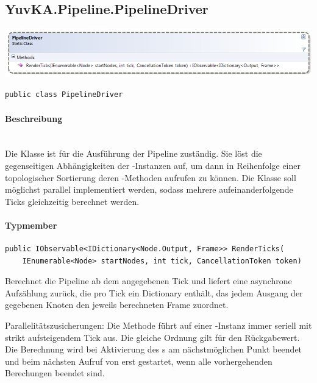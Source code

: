 \subsection{YuvKA.Pipeline.PipelineDriver}

\includegraphics[width=\textwidth]{YuvKA.Pipeline/driver.png}
\begin{verbatim}
public class PipelineDriver
\end{verbatim}

\paragraph{Beschreibung}~\\
Die Klasse  ist für die Ausführung der Pipeline zuständig. Sie löst die gegenseitigen Abhängigkeiten der -Instanzen auf, um dann in Reihenfolge einer topologischer Sortierung deren -Methoden aufrufen zu können.
Die Klasse soll möglichst parallel implementiert werden, sodass mehrere aufeinanderfolgende Ticks gleichzeitig berechnet werden.

\paragraph{Typmember}
\begin{itemize}

	\begin{verbatim}
public IObservable<IDictionary<Node.Output, Frame>> RenderTicks(
    IEnumerable<Node> startNodes, int tick, CancellationToken token)
    \end{verbatim}
	Berechnet die Pipeline ab dem angegebenen Tick und liefert eine asynchrone Aufzählung zurück, die pro Tick ein Dictionary enthält, das jedem Ausgang der gegebenen Knoten  den jeweils berechneten Frame zuordnet.

    Parallelitätszusicherungen: Die Methode führt auf einer -Instanz  immer seriell mit strikt aufsteigendem Tick aus. Die gleiche Ordnung gilt für den Rückgabewert. Die Berechnung wird bei Aktivierung des s am nächstmöglichen Punkt beendet und beim nächsten Aufruf von  erst gestartet, wenn alle vorhergehenden Berechungen beendet sind.

\end{itemize}
